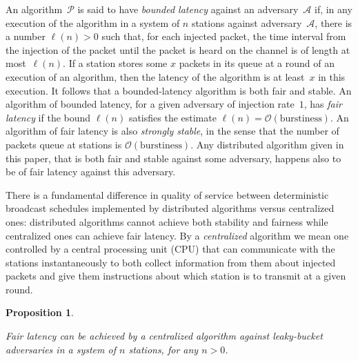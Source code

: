 \documentclass[11pt]{article}
\newcommand{\cA}{\mathcal{A}}
\newcommand{\cO}{\mathcal{O}}
\newcommand{\cP}{\mathcal{P}}
\newtheorem{proposition}{Proposition}
\begin{document}
An algorithm~$\cP$ is said to have \emph{bounded latency} against an adversary~$\cA$ if, in any execution of the algorithm in a system of $n$ stations against adversary~$\cA$, there is a number $\ell(n) >0$ such that, for each injected packet, the time interval from the injection of the packet until the packet is heard on the channel is of length at most~$\ell(n)$.
If a station stores some $x$ packets in its queue at a round of an execution of an algorithm, then the latency of the algorithm is at least~$x$ in this execution.
It follows that a bounded-latency algorithm is both fair and stable.
An algorithm of bounded latency, for a given adversary of injection rate~$1$, has \emph{fair latency} if the bound $\ell(n)$ satisfies the estimate $\ell(n)=\cO(\text{burstiness})$.
An algorithm of fair latency is also \emph{strongly stable}, in the sense that the number of packets queue at stations is $\cO(\text{burstiness})$.
Any distributed algorithm given in this paper, that is both fair and stable against some adversary, happens also to be of fair latency against this adversary.


There is a fundamental difference in quality of service between deterministic broadcast schedules implemented by distributed algorithms versus centralized ones: distributed algorithms cannot achieve both stability and fairness while centralized ones can achieve fair latency.
By a \emph{centralized} algorithm we mean one controlled by a central processing unit (CPU) that can communicate with the stations instantaneously to both collect information from them about injected packets and give them instructions about which station is to transmit at a given round.




\begin{proposition}
\label{prop:centralized-algorithm}

Fair latency can be achieved by a centralized algorithm against leaky-bucket adversaries in a system of $n$ stations, for any $n>0$.
\end{proposition}
\end{document}
